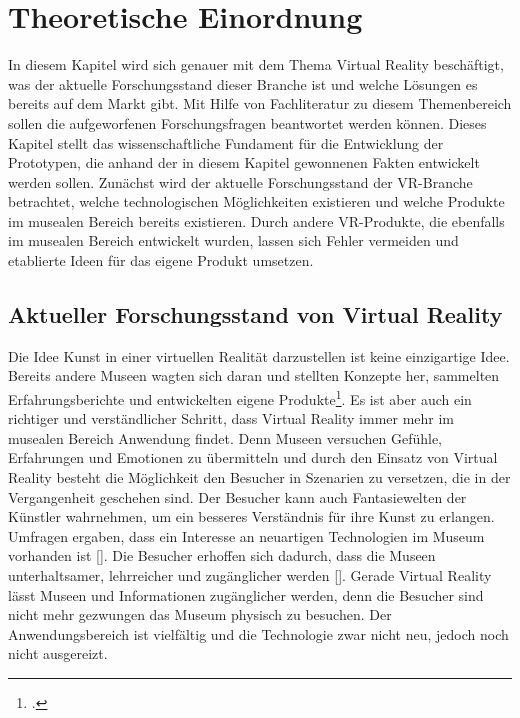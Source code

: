 \documentclass[a4paper,12pt,oneside]{article}
\begin{document}
      
  \section{Theoretische Einordnung}
    In diesem Kapitel wird sich genauer mit dem Thema Virtual Reality beschäftigt, was 
    der aktuelle Forschungsstand dieser Branche ist und welche Lösungen es bereits auf 
    dem Markt gibt. Mit Hilfe von Fachliteratur zu diesem Themenbereich sollen die
    aufgeworfenen Forschungsfragen beantwortet werden können. Dieses Kapitel stellt das
    wissenschaftliche Fundament für die Entwicklung der Prototypen, die anhand der in
    diesem Kapitel gewonnenen Fakten entwickelt werden sollen. Zunächst wird der aktuelle
    Forschungsstand der VR-Branche betrachtet, welche technologischen
    Möglichkeiten existieren und welche Produkte im musealen Bereich bereits existieren.
    Durch andere VR-Produkte, die ebenfalls im musealen Bereich entwickelt wurden, lassen
    sich Fehler vermeiden und etablierte Ideen für das eigene Produkt umsetzen.
    \subsection{Aktueller Forschungsstand von Virtual Reality}
      Die Idee Kunst in einer virtuellen Realität darzustellen ist keine einzigartige Idee.
      Bereits andere Museen wagten sich daran und stellten Konzepte her, sammelten
      Erfahrungsberichte und entwickelten eigene Produkte\footcite{Heidsiek2019}. Es ist
      aber auch ein richtiger und verständlicher Schritt, dass Virtual Reality immer mehr
      im musealen Bereich Anwendung findet. Denn Museen versuchen Gefühle,
      Erfahrungen und Emotionen zu übermitteln und durch den Einsatz von Virtual Reality
      besteht die Möglichkeit den Besucher in Szenarien zu versetzen, die in der
      Vergangenheit geschehen sind. Der Besucher kann auch Fantasiewelten der Künstler
      wahrnehmen, um ein besseres Verständnis für ihre Kunst zu erlangen. Umfragen ergaben, 
      dass ein Interesse an neuartigen Technologien im Museum vorhanden ist [\cite[34]{Heidsiek2019}].
      Die Besucher erhoffen sich dadurch, dass die Museen unterhaltsamer, lehrreicher und
      zugänglicher werden [\cite[34]{Heidsiek2019}]. Gerade Virtual Reality lässt Museen
      und Informationen zugänglicher werden, denn die Besucher sind nicht mehr gezwungen 
      das Museum physisch zu besuchen. Der Anwendungsbereich ist vielfältig und die 
      Technologie zwar nicht neu, jedoch noch nicht ausgereizt. 
\end{document}

